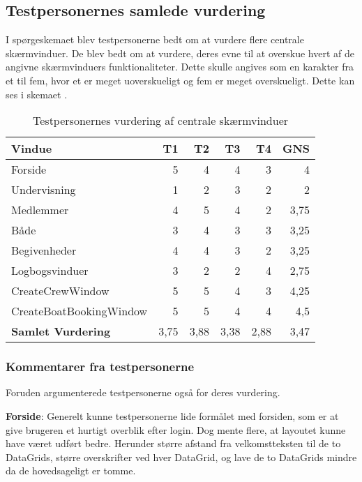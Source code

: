 \subsection{Testpersonernes samlede vurdering}

I spørgeskemaet blev testpersonerne bedt om at vurdere flere centrale skærmvinduer.
De blev bedt om at vurdere, deres evne til at overskue hvert af de angivne skærmvinduers funktionaliteter.
Dette skulle angives som en karakter fra et til fem, hvor et er meget uoverskueligt og fem er meget overskueligt.
Dette kan ses i skemaet .

\begin{table}[htbp]
    \centering
    \caption{Testpersonernes vurdering af centrale skærmvinduer}
    \begin{tabular}{l|rrrr|r}
        \toprule
        \textbf{Vindue} & T1 & T2 & T3 & T4 & \textbf{GNS} \\
        \midrule
        Forside & 5 & 4 & 4 & 3 & 4 \\
        Undervisning & 1 & 2 & 3 & 2 & 2 \\
        Medlemmer & 4 & 5 & 4 & 2 & 3,75 \\
        Både & 3 & 4 & 3 & 3 & 3,25 \\
        Begivenheder & 4 & 4 & 3 & 2 & 3,25 \\
        Logbogsvinduer & 3 & 2 & 2 & 4 & 2,75 \\
        CreateCrewWindow & 5 & 5 & 4 & 3 & 4,25 \\
        CreateBoatBookingWindow & 5 & 5 & 4 & 4 & 4,5 \\ \hline
        \textbf{Samlet Vurdering} & 3,75 & 3,88 & 3,38 & 2,88 & 3,47 \\
    \end{tabular}%
    \label{tab:vurderingtest}%
\end{table}%

\subsubsection*{Kommentarer fra testpersonerne}
Foruden  argumenterede testpersonerne også for deres vurdering.

\textbf{Forside}: 
Generelt kunne testpersonerne lide formålet med forsiden, som er at give brugeren et hurtigt overblik efter login. 
Dog mente flere, at layoutet kunne have været udført bedre.
Herunder større afstand fra velkomstteksten til de to DataGrids, større overskrifter ved hver DataGrid, og lave de to DataGrids mindre da de hovedsageligt er tomme. 

